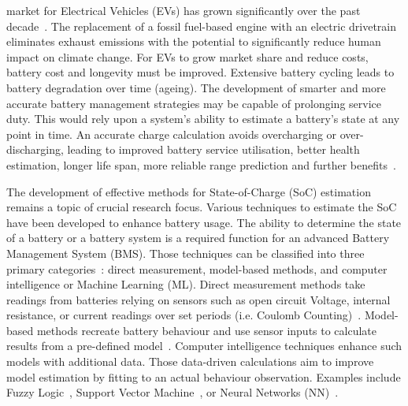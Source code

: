 %
 market for Electrical Vehicles (EVs) has grown significantly over the past decade~\cite{state-ev-australia}.
The replacement of a fossil fuel-based engine with an electric drivetrain eliminates exhaust emissions with the potential to significantly reduce human impact on climate change.
For EVs to grow market share and reduce costs, battery cost and longevity must be improved.
Extensive battery cycling leads to battery degradation over time (ageing).
The development of smarter and more accurate battery management strategies may be capable of prolonging service duty.
This would rely upon a system's ability to estimate a battery's state at any point in time.
An accurate charge calculation avoids overcharging or over-discharging, leading to improved battery service utilisation, better health estimation, longer life span, more reliable range prediction and further benefits~\cite{calif_proper_2008}.

%
The development of effective methods for State-of-Charge (SoC) estimation remains a topic of crucial research focus.
Various techniques to estimate the SoC have been developed to enhance battery usage.
The ability to determine the state of a battery or a battery system is a required function for an advanced Battery Management System (BMS).
Those techniques can be classified into three primary categories~\cite{ali_towards_2019,ng_enhanced_2009,robust_SoC,6953745}: direct measurement, model-based methods, and computer intelligence or Machine Learning (ML).
Direct measurement methods take readings from batteries relying on sensors such as open circuit Voltage, internal resistance, or current readings over set periods (i.e. Coulomb Counting)~\cite{ng_enhanced_2009,robust_SoC}.
Model-based methods recreate battery behaviour and use sensor inputs to calculate results from a pre-defined model~\cite{6953745}.
Computer intelligence techniques enhance such models with additional data.
Those data-driven calculations aim to improve model estimation by fitting to an actual behaviour observation.
Examples include Fuzzy Logic~\cite{malkhandi_fuzzy_2006}, Support Vector Machine~\cite{hansen_support_2005, anton_battery_2013}, or Neural Networks (NN)~\cite{song_lithium-ion_2018,Chemali2017,mamo_long_2020,jiao_gru-rnn_2020,xiao_accurate_2019,javid_adaptive_2020,zhang_deep_2020}.

